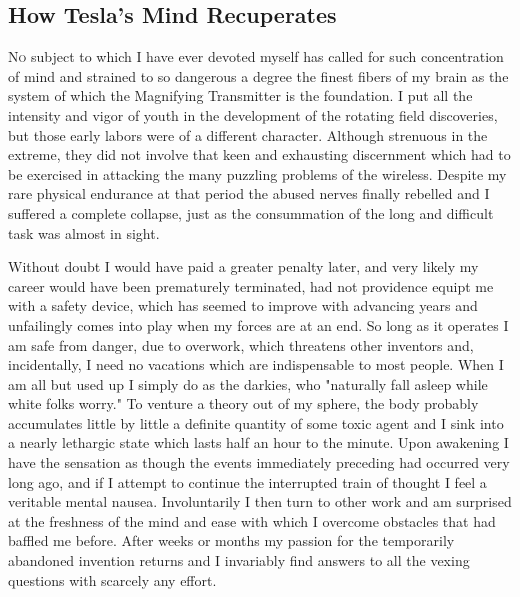 \documentclass[a4paper,12pt,english,twoside,openright]{memoir}
\begin{document}

\subsection{How Tesla's Mind Recuperates}

\lettrine[lines=3]{N}{o} subject to which I have ever devoted myself has called for such concentration of mind and 
strained to so dangerous a degree the finest fibers of my brain as the system of which the 
Magnifying Transmitter is the foundation.  I put all the intensity and vigor of youth in the 
development of the rotating field discoveries, but those early labors were of a different character.  
Although strenuous in the extreme, they did not involve that keen and exhausting discernment 
which had to be exercised in attacking the many puzzling problems of the wireless.  Despite my 
rare physical endurance at that period the abused nerves finally rebelled and I suffered a 
complete collapse, just as the consummation of the long and difficult task was almost in sight.  

Without doubt I would have paid a greater penalty later, and very likely my career would have 
been prematurely terminated, had not providence equipt me with a safety device, which has 
seemed to improve with advancing years and unfailingly comes into play when my forces are at 
an end.  So long as it operates I am safe from danger, due to overwork, which threatens other 
inventors and, incidentally, I need no vacations which are indispensable to most people.  When I 
am all but used up I simply do as the darkies, who "naturally fall asleep while white folks worry." 
To venture a theory out of my sphere, the body probably accumulates little by little a definite 
quantity of some toxic agent and I sink into a nearly lethargic state which lasts half an hour to the 
minute.  Upon awakening I have the sensation as though the events immediately preceding had 
occurred very long ago, and if I attempt to continue the interrupted train of thought I feel a 
veritable mental nausea.  Involuntarily I then turn to other work and am surprised at the freshness 
of the mind and ease with which I overcome obstacles that had baffled me before.  After weeks or 
months my passion for the temporarily abandoned invention returns and I invariably find answers 
to all the vexing questions with scarcely any effort.  
\end{document}
